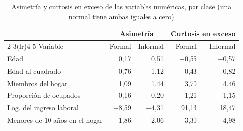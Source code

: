 \begin{table}[H]
\caption{Asimetría y curtosis en exceso de las variables numéricas, por clase (una normal tiene ambas iguales a cero)}
\label{tab:lda_normalidad}
\centering
\footnotesize
\begin{tabular}{lrrrr}
\toprule
 & \multicolumn{2}{c}{Asimetría} & \multicolumn{2}{c}{Curtosis en exceso} \\
\cmidrule(lr){2-3}\cmidrule(lr){4-5}
Variable & Formal & Informal & Formal & Informal \\
\midrule
Edad & 0,17 & 0,51 & $-$0,55 & $-$0,57 \\
Edad al cuadrado & 0,76 & 1,12 & 0,43 & 0,82 \\
Miembros del hogar & 1,09 & 1,44 & 3,70 & 4,46 \\
Proporción de ocupados & 0,16 & 0,20 & $-$1,26 & $-$1,15 \\
Log. del ingreso laboral & $-$8,59 & $-$4,31 & 91,13 & 18,47 \\
Menores de 10 años en el hogar & 1,86 & 2,06 & 3,30 & 4,98 \\
\bottomrule
\end{tabular}
\end{table}
